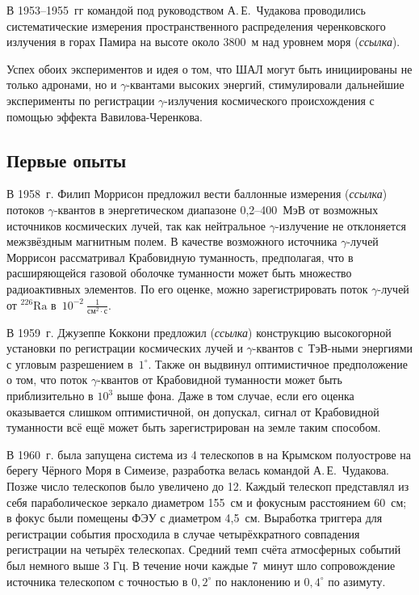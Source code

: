 \documentclass[magd,floatypics,numeref]{msudipl} %
\begin{document}
В 1953--1955~гг командой под руководством А.\,Е.~Чудакова проводились систематические измерения пространственного распределения черенковского излучения в горах Памира на высоте около 3800~м над уровнем моря (\textit{ссылка}).

Успех обоих экспериментов и идея о том, что ШАЛ могут быть инициированы не только адронами, но и $\gamma$-квантами высоких энергий, стимулировали дальнейшие эксперименты по регистрации $\gamma$-излучения космического происхождения с помощью эффекта Вавилова-Черенкова. 
\subsection{Первые опыты}
В 1958~г. Филип Моррисон предложил вести баллонные измерения  (\textit{ссылка}) потоков $\gamma$-квантов в энергетическом диапазоне 0,2--400~МэВ от возможных источников космических лучей, так как нейтральное  $\gamma$-излучение не отклоняется межзвёздным магнитным полем. В качестве возможного источника $\gamma$-лучей Моррисон рассматривал Крабовидную туманность, предполагая, что в расширяющейся газовой оболочке туманности может быть множество радиоактивных элементов. По его оценке, можно зарегистрировать поток $\gamma$-лучей от $^{226}\text{Ra}$ в~$10^{-2}~\frac{1}{\text{см}^2\cdot\text{с}}$.

В 1959~г. Джузеппе Коккони предложил  (\textit{ссылка}) конструкцию высокогорной установки по регистрации космических лучей и $\gamma$-квантов с~ТэВ-ными энергиями с угловым разрешением в~$1^\circ$. Также он выдвинул оптимистичное предположение о том, что поток $\gamma$-квантов от Крабовидной туманности может быть приблизительно в $10^3$  выше фона. Даже в том случае, если его оценка оказывается слишком оптимистичной, он допускал, сигнал от Крабовидной туманности всё ещё может быть зарегистрирован на земле таким способом. 

В 1960~г. была запущена система из 4 телескопов в на Крымском полуострове на берегу Чёрного Моря в Симеизе, разработка велась командой А.\,Е.~Чудакова. Позже число телескопов было увеличено до 12. Каждый телескоп представлял из себя параболическое зеркало диаметром 155~см и фокусным расстоянием 60~см; в фокус были помещены ФЭУ с диаметром 4,5~см. Выработка триггера для регистрации события просходила в случае четырёхкратного совпадения регистрации на четырёх телескопах. Средний темп счёта атмосферных событий был немного выше  3 Гц. В течение ночи каждые 7~минут шло сопровождение источника телескопом с точностью в $0,2^{\circ}$ по наклонению и $0,4^{\circ}$ по азимуту.
\end{document}
